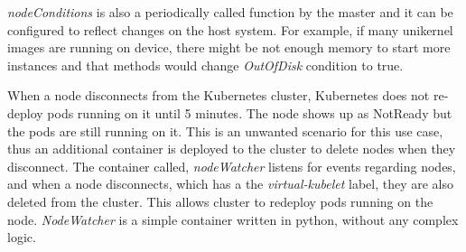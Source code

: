 \textit{nodeConditions} is also a periodically called function by the master and it can be configured to reflect changes on the host system. For example, if many unikernel images are running on device, there might be not enough memory to start more instances and that methods would change \textit{OutOfDisk} condition to true.

When a node disconnects from the Kubernetes cluster, Kubernetes does not re-deploy pods running on it until 5 minutes. The node shows up as NotReady but the pods are still running on it. This is an unwanted scenario for this use case, thus an additional container is deployed to the cluster to delete nodes when they disconnect. The container called, \textit{nodeWatcher} listens for events regarding nodes, and when a node disconnects, which has a the \textit{virtual-kubelet} label, they are also deleted from the cluster. This allows cluster to redeploy pods running on the node. \textit{NodeWatcher} is a simple container written in python, without any complex logic.